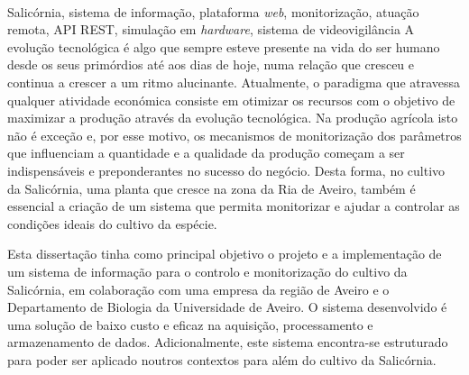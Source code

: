 \documentclass[11pt,twoside,a4paper]{report}
\begin{document}
\EndTitlePage
\titlepage\ \endtitlepage %

\TitlePage
	\vspace*{55mm}
	{Salicórnia, sistema de informação, plataforma \textit{web},  monitorização, atuação remota, API REST, simulação em \textit{hardware}, sistema de videovigilância}
  	\vspace*{5mm}
       {A evolução tecnológica é algo que sempre esteve presente na vida do ser humano desde os seus primórdios até aos dias de hoje, numa relação que cresceu e continua a crescer a um ritmo alucinante.  Atualmente, o paradigma que atravessa qualquer atividade económica consiste em otimizar os recursos com o objetivo de maximizar a produção através da evolução tecnológica. Na produção agrícola isto não é exceção e, por esse motivo, os mecanismos de monitorização dos parâmetros que influenciam a quantidade e a qualidade da produção começam a ser indispensáveis e preponderantes no sucesso do negócio. Desta forma, no cultivo da Salicórnia, uma planta que cresce na zona da Ria de Aveiro, também é essencial a criação de um sistema que permita monitorizar e ajudar a controlar as condições ideais do cultivo da espécie. }
              
  \TEXT{}
       {Esta dissertação tinha como principal objetivo o projeto e a implementação de um sistema de informação para o controlo e monitorização do cultivo da Salicórnia, em colaboração com uma empresa da região de Aveiro e o Departamento de Biologia da Universidade de Aveiro. O sistema desenvolvido é uma solução de baixo custo e eficaz na aquisição, processamento e armazenamento de dados. Adicionalmente, este sistema encontra-se estruturado para poder ser aplicado noutros contextos para além do cultivo da Salicórnia.   }
       
       

       
\end{document}
